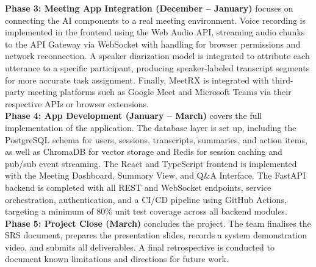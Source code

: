 {  \textbf{Phase 3: Meeting App Integration (December -- January)} focuses on connecting
  the AI components to a real meeting environment. Voice recording is implemented in the
  frontend using the Web Audio API, streaming audio chunks to the API Gateway via
  WebSocket with handling for browser permissions and network reconnection. A speaker
  diarization model is integrated to attribute each utterance to a specific participant,
  producing speaker-labeled transcript segments for more accurate task assignment.
  Finally, MeetRX is integrated with third-party meeting platforms such as Google Meet
  and Microsoft Teams via their respective APIs or browser extensions.\\[1em]

  \textbf{Phase 4: App Development (January -- March)} covers the full implementation of
  the application. The database layer is set up, including the PostgreSQL schema for
  users, sessions, transcripts, summaries, and action items, as well as ChromaDB for
  vector storage and Redis for session caching and pub/sub event streaming. The React and
  TypeScript frontend is implemented with the Meeting Dashboard, Summary View, and Q\&A
  Interface. The FastAPI backend is completed with all REST and WebSocket endpoints,
  service orchestration, authentication, and a CI/CD pipeline using GitHub Actions,
  targeting a minimum of 80\% unit test coverage across all backend modules.\\[1em]

  \textbf{Phase 5: Project Close (March)} concludes the project. The team finalises
  the SRS document, prepares the presentation slides, records a system demonstration
  video, and submits all deliverables. A final retrospective is conducted to document
  known limitations and directions for future work. \\[1em]
}
